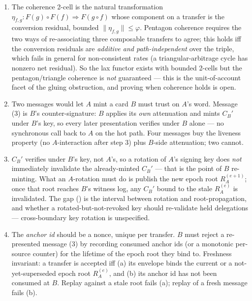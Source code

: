 \begin{enumerate}[label=\textbf{IV.\arabic*},leftmargin=2.8em,itemsep=8pt,topsep=4pt]
\item \wbopen\wbstar The coherence 2-cell is the natural transformation
  $\eta_{f,g}: F(g)\circ F(f)\Rightarrow F(g\circ f)$ whose component on a transfer
  is the conversion residual, bounded $\|\eta_{f,g}\|\le\varphi$. Pentagon coherence
  requires the two ways of re-associating three composable transfers to agree; this
  holds iff the conversion residuals are \emph{additive and path-independent} over the
  triple, which fails in general for non-consistent rates (a triangular-arbitrage
  cycle has nonzero net residual). So the lax functor exists with bounded 2-cells but
  the pentagon/triangle coherence is \emph{not} guaranteed --- this is the
  unit-of-account facet of the gluing obstruction, and proving when coherence holds
  is open.

\item \wbcheck Two messages would let $A$ mint a card $B$ must trust on $A$'s word.
  Message (3) is $B$'s counter-signature: $B$ applies its \emph{own} attenuation and
  mints $C_B'$ under $B$'s key, so every later presentation verifies under $B$ alone
  --- no synchronous call back to $A$ on the hot path. Four messages buy the liveness
  property (no $A$-interaction after step 3) plus $B$-side attenuation; two cannot.

\item \wbtrace $C_B'$ verifies under $B$'s key, not $A$'s, so a rotation of $A$'s
  signing key does \emph{not} immediately invalidate the already-minted $C_B'$ ---
  that is the point of $B$ re-minting. What an $A$-rotation must do is publish the new
  epoch root $R_A^{(e+1)}$; once that root reaches $B$'s witness log, any $C_B'$ bound
  to the stale $R_A^{(e)}$ is invalidated. The gap (\openmark{}) is the interval
  between rotation and root-propagation, and whether a rotated-but-not-revoked key
  should re-validate held delegations --- cross-boundary key rotation is unspecified.

\item \wbopen\wbstar The \emph{anchor id} should be a nonce, unique per transfer.
  $B$ must reject a re-presented message (3) by recording consumed anchor ids (or a
  monotonic per-source counter) for the lifetime of the epoch root they bind to.
  Freshness invariant: a transfer is accepted iff (a) its envelope binds the current
  or a not-yet-superseded epoch root $R_A^{(e)}$, and (b) its anchor id has not been
  consumed at $B$. Replay against a stale root fails (a); replay of a fresh message
  fails (b).


\end{enumerate}

